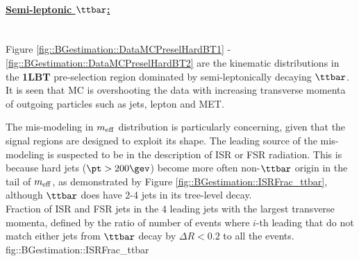 \clearpage
\paragraph{\underline{Semi-leptonic $\ttbar$:}} \mbox{} \\
Figure \ref{fig::BGestimation::DataMCPreselHardBT1} - \ref{fig::BGestimation::DataMCPreselHardBT2} are the kinematic distributions in the \textbf{1LBT} pre-selection region dominated by semi-leptonically decaying $\ttbar$. It is seen that MC is overshooting the data with increasing transverse momenta of outgoing particles such as jets, lepton and MET. 


%
%
\clearpage

\noindent The mis-modeling in $m_{\mathrm{eff}}$ distribution is particularly concerning, given that the signal regions are designed to exploit its shape. The leading source of the mis-modeling is suspected to be in the description of ISR or FSR radiation. This is because hard jets ($\pt>200 \gev$) become more often non-$\ttbar$ origin in the tail of $m_{\mathrm{eff}}$, as demonstrated by Figure \ref{fig::BGestimation::ISRFrac_ttbar}, although $\ttbar$ does have 2-4 jets in its tree-level decay. \\

{Fraction of ISR and FSR jets in the 4 leading jets with the largest transverse momenta, defined by the ratio of number of events where $i$-th leading that do not match either jets from $\ttbar$ decay by $\Delta R<0.2$ to all the events.}
{fig::BGestimation::ISRFrac_ttbar}

